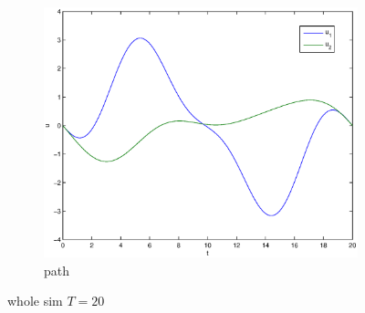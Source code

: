 \begin{figure}
\begin{subfigure}[b]{\textwidth}
\centering
\includegraphics[height=0.3\textheight]{img/final_15_1_20_u.eps}
\caption{path}
\end{subfigure}
\caption{whole sim $T=20$}
\end{figure}


